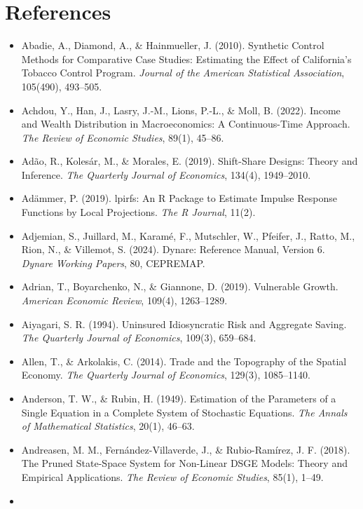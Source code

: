 \documentclass[11pt,letterpaper]{article}
\providecommand{\tightlist}{\setlength{\itemsep}{0pt}\setlength{\parskip}{0pt}}
\newcounter{none} %
\renewcommand{\_}{\pmunderscore\allowbreak}
\begin{document}
\section*{References}\label{references}

\begin{itemize}
\tightlist
\item
  Abadie, A., Diamond, A., \& Hainmueller, J. (2010). Synthetic Control Methods for Comparative Case Studies: Estimating the Effect of California's Tobacco Control Program. \emph{Journal of the American Statistical Association}, 105(490), 493--505.
\item
  Achdou, Y., Han, J., Lasry, J.-M., Lions, P.-L., \& Moll, B. (2022). Income and Wealth Distribution in Macroeconomics: A Continuous-Time Approach. \emph{The Review of Economic Studies}, 89(1), 45--86.
\item
  Adão, R., Kolesár, M., \& Morales, E. (2019). Shift-Share Designs: Theory and Inference. \emph{The Quarterly Journal of Economics}, 134(4), 1949--2010.
\item
  Adämmer, P. (2019). lpirfs: An R Package to Estimate Impulse Response Functions by Local Projections. \emph{The R Journal}, 11(2).
\item
  Adjemian, S., Juillard, M., Karamé, F., Mutschler, W., Pfeifer, J., Ratto, M., Rion, N., \& Villemot, S. (2024). Dynare: Reference Manual, Version 6. \emph{Dynare Working Papers}, 80, CEPREMAP.
\item
  Adrian, T., Boyarchenko, N., \& Giannone, D. (2019). Vulnerable Growth. \emph{American Economic Review}, 109(4), 1263--1289.
\item
  Aiyagari, S. R. (1994). Uninsured Idiosyncratic Risk and Aggregate Saving. \emph{The Quarterly Journal of Economics}, 109(3), 659--684.
\item
  Allen, T., \& Arkolakis, C. (2014). Trade and the Topography of the Spatial Economy. \emph{The Quarterly Journal of Economics}, 129(3), 1085--1140.
\item
  Anderson, T. W., \& Rubin, H. (1949). Estimation of the Parameters of a Single Equation in a Complete System of Stochastic Equations. \emph{The Annals of Mathematical Statistics}, 20(1), 46--63.
\item
  Andreasen, M. M., Fernández-Villaverde, J., \& Rubio-Ramírez, J. F. (2018). The Pruned State-Space System for Non-Linear DSGE Models: Theory and Empirical Applications. \emph{The Review of Economic Studies}, 85(1), 1--49.
\item

\end{itemize}
\end{document}
